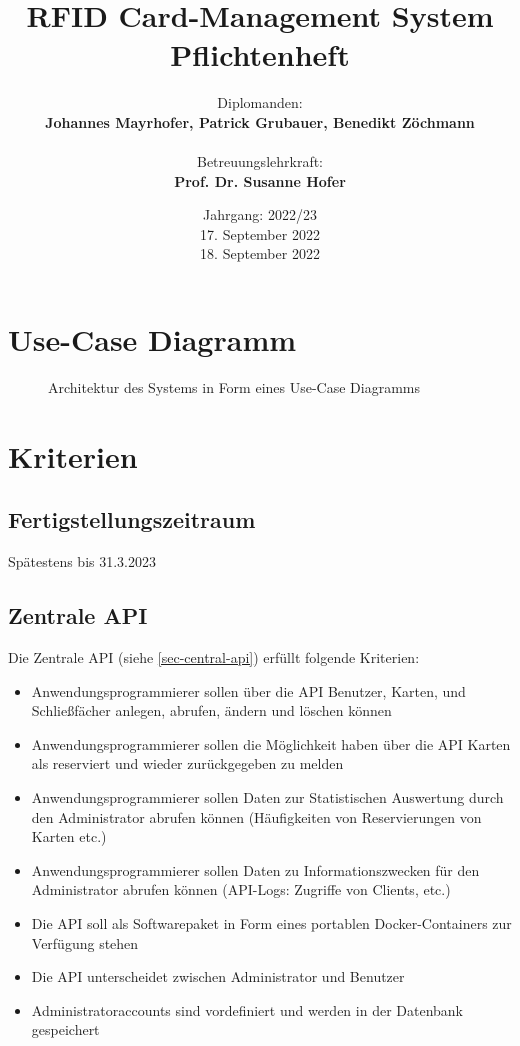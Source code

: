 \documentclass[a4paper]{article}
\title{\Huge{RFID Card-Management System\\ Pflichtenheft}}
\author{
    Diplomanden:\\
    \textbf{Johannes Mayrhofer, Patrick Grubauer, Benedikt Z\"ochmann}\\\\
    Betreuungslehrkraft:\\
    \textbf{Prof. Dr. Susanne Hofer}
}
\date{
    Jahrgang: 2022/23\\
    \vspace{0.4cm}
    17. September 2022\\
    18. September 2022
}
\begin{document}
    \maketitle
    \titlerule
    \tableofcontents
\restoregeometry

\newpage

\section{Use-Case Diagramm}
\begin{figure}[htbp]
  \centering
   
  \caption{Architektur des Systems in Form eines Use-Case Diagramms}
  \label{architecture}
\end{figure}

\section{Kriterien}
\subsection{Fertigstellungszeitraum}
Sp\"atestens bis 31.3.2023

\subsection{Zentrale API}
Die Zentrale API (siehe \ref{sec-central-api}) erfüllt folgende Kriterien:
\begin{itemize}
    \item Anwendungsprogrammierer sollen über die API Benutzer, Karten, und Schließfächer anlegen, abrufen, ändern und löschen können
    \item Anwendungsprogrammierer sollen die Möglichkeit haben über die API Karten als reserviert und wieder zurückgegeben zu melden
    \item Anwendungsprogrammierer sollen Daten zur Statistischen Auswertung durch den Administrator abrufen können (Häufigkeiten von Reservierungen von Karten etc.)
    \item Anwendungsprogrammierer sollen Daten zu Informationszwecken für den Administrator abrufen können (API-Logs: Zugriffe von Clients, etc.)
    \item Die API soll als Softwarepaket in Form eines portablen Docker-Containers zur Verfügung stehen
    \item Die API unterscheidet zwischen Administrator und Benutzer
    \item Administratoraccounts sind vordefiniert und werden in der Datenbank gespeichert 
\end{itemize}
\end{document}
